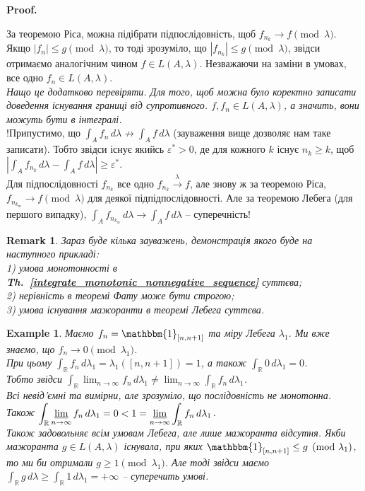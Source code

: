 \documentclass[a4paper, 10pt]{article}
\makeatletter
\theoremstyle{theoremdd}
\newtheorem{example}[theorem]{Example}
\newtheorem{remark}[theorem]{Remark}
\newcommand\thref[1]{\textbf{Th.~\ref{#1}}}
\newcommand\tomeasure[1]{\overset{{#1}}{\to}}
\renewenvironment{proof}[1][Proof.\\]{\par
\pushQED{\hfill \qed}%
\normalfont \topsep6\p@\@plus6\p@\relax
\trivlist
\item\relax
{\bfseries
#1\@addpunct{.}}\hspace\labelsep\ignorespaces
}{%
\popQED\endtrivlist\@endpefalse
}
\makeatother
\begin{document}
\begin{proof}
За теоремою Ріса, можна підібрати підпослідовність, щоб $f_{n_k} \to f \pmod \lambda$. Якщо $|f_n| \leq g \pmod \lambda$, то тоді зрозуміло, що $|f_{n_k}| \leq g \pmod \lambda$, звідси отримаємо аналогічним чином $f \in L(A,\lambda)$. Незважаючи на заміни в умовах, все одно $f_n \in L(A,\lambda)$.\\
\textit{Нащо це додатково перевіряти. Для того, щоб можна було коректно записати доведення існування границі від супротивного. $f,f_n \in L(A,\lambda)$, а значить, вони можуть бути в інтегралі.}
\bigskip \\
!Припустимо, що $\displaystyle\int_A f_n\,d\lambda \not\to \int_A f\,d\lambda$ (зауваження вище дозволяє нам таке записати). Тобто звідси існує якийсь $\varepsilon^* > 0$, де для кожного $k$ існує $n_k \geq k$, щоб $\displaystyle\left| \int_A f_{n_k}\,d\lambda - \int_A f\,d\lambda \right| \geq \varepsilon^*$.\\
Для підпослідовності $f_{n_k}$ все одно $f_{n_k} \tomeasure{\lambda} f$, але знову ж за теоремою Ріса, $f_{n_{k_m}} \to f \pmod \lambda$ для деякої підпідпослідовності. Але за теоремою Лебега (для першого випадку), $\displaystyle\int_A f_{n_{k_m}}\,d\lambda \to \int_A f\,d\lambda$ -- суперечність!
\end{proof}

\begin{remark}
Зараз буде кілька зауважень, демонстрація якого буде на наступного прикладі:\\
1) умова монотонності в \thref{integrate_monotonic_nonnegative_sequence} суттєва;\\
2) нерівність в теоремі Фату може бути строгою;\\
3) умова існування мажоранти в теоремі Лебега суттєва.
\end{remark}

\begin{example}
Маємо $f_n = \mathbbm{1}_{[n,n+1]}$ та міру Лебега $\lambda_1$. Ми вже знаємо, що $f_n \to 0 \pmod {\lambda_1}$.\\
При цьому $\displaystyle\int_\mathbb{R} f_n\,d\lambda_1 = \lambda_1([n,n+1]) = 1$, а також $\displaystyle\int_\mathbb{R} 0\,d\lambda_1 = 0$. \\
Тобто звідси $\displaystyle\int_\mathbb{R} \lim_{n \to \infty} f_n\,d\lambda_1 \neq \lim_{n \to \infty} \int_\mathbb{R} f_n\,d\lambda_1$.\\
Всі невід'ємні та вимірни, але зрозуміло, що послідовність не монотонна.\\
Також $\displaystyle\int_\mathbb{R} \varliminf_{n \to \infty} f_n\,d\lambda_1 = 0 < 1 = \varliminf_{n \to \infty} \int_\mathbb{R} f_n\,d\lambda_1$.\\
Також задовольняє всім умовам Лебега, але лише мажоранта відсутня. Якби мажоранта $g \in L(A,\lambda)$ існувала, при яких $\mathbbm{1}_{[n,n+1]} \leq g \pmod {\lambda_1}$, то ми би отримали $g \geq 1 \pmod {\lambda_1}$. Але тоді звідси маємо $\displaystyle\int_\mathbb{R} g\,d\lambda \geq \int_\mathbb{R} 1\,d\lambda_1 = +\infty$ -- суперечить умові.
\end{example}
\end{document}
